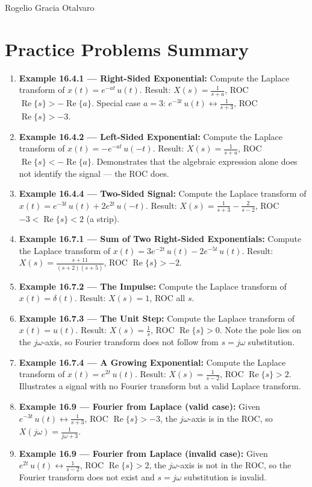 \documentclass[11pt]{article}
\begin{document}
Rogelio Gracia Otalvaro

\section*{Practice Problems Summary}

\begin{enumerate}
  \item \textbf{Example 16.4.1 — Right-Sided Exponential:} Compute the Laplace transform of $x(t) = e^{-at}\,u(t)$. Result: $X(s) = \frac{1}{s+a}$, ROC $\operatorname{Re}\{s\} > -\operatorname{Re}\{a\}$. Special case $a = 3$: $e^{-3t}\,u(t) \leftrightarrow \frac{1}{s+3}$, ROC $\operatorname{Re}\{s\} > -3$.
  \item \textbf{Example 16.4.2 — Left-Sided Exponential:} Compute the Laplace transform of $x(t) = -e^{-at}\,u(-t)$. Result: $X(s) = \frac{1}{s+a}$, ROC $\operatorname{Re}\{s\} < -\operatorname{Re}\{a\}$. Demonstrates that the algebraic expression alone does not identify the signal — the ROC does.
  \item \textbf{Example 16.4.4 — Two-Sided Signal:} Compute the Laplace transform of $x(t) = e^{-3t}\,u(t) + 2e^{2t}\,u(-t)$. Result: $X(s) = \frac{1}{s+3} - \frac{2}{s-2}$, ROC $-3 < \operatorname{Re}\{s\} < 2$ (a strip).
  \item \textbf{Example 16.7.1 — Sum of Two Right-Sided Exponentials:} Compute the Laplace transform of $x(t) = 3e^{-2t}\,u(t) - 2e^{-5t}\,u(t)$. Result: $X(s) = \frac{s+11}{(s+2)(s+5)}$, ROC $\operatorname{Re}\{s\} > -2$.
  \item \textbf{Example 16.7.2 — The Impulse:} Compute the Laplace transform of $x(t) = \delta(t)$. Result: $X(s) = 1$, ROC all $s$.
  \item \textbf{Example 16.7.3 — The Unit Step:} Compute the Laplace transform of $x(t) = u(t)$. Result: $X(s) = \frac{1}{s}$, ROC $\operatorname{Re}\{s\} > 0$. Note the pole lies on the $j\omega$-axis, so Fourier transform does not follow from $s = j\omega$ substitution.
  \item \textbf{Example 16.7.4 — A Growing Exponential:} Compute the Laplace transform of $x(t) = e^{2t}\,u(t)$. Result: $X(s) = \frac{1}{s-2}$, ROC $\operatorname{Re}\{s\} > 2$. Illustrates a signal with no Fourier transform but a valid Laplace transform.
  \item \textbf{Example 16.9 — Fourier from Laplace (valid case):} Given $e^{-3t}\,u(t) \leftrightarrow \frac{1}{s+3}$, ROC $\operatorname{Re}\{s\} > -3$, the $j\omega$-axis is in the ROC, so $X(j\omega) = \frac{1}{j\omega + 3}$.
  \item \textbf{Example 16.9 — Fourier from Laplace (invalid case):} Given $e^{2t}\,u(t) \leftrightarrow \frac{1}{s-2}$, ROC $\operatorname{Re}\{s\} > 2$, the $j\omega$-axis is not in the ROC, so the Fourier transform does not exist and $s = j\omega$ substitution is invalid.
\end{enumerate}
\end{document}
